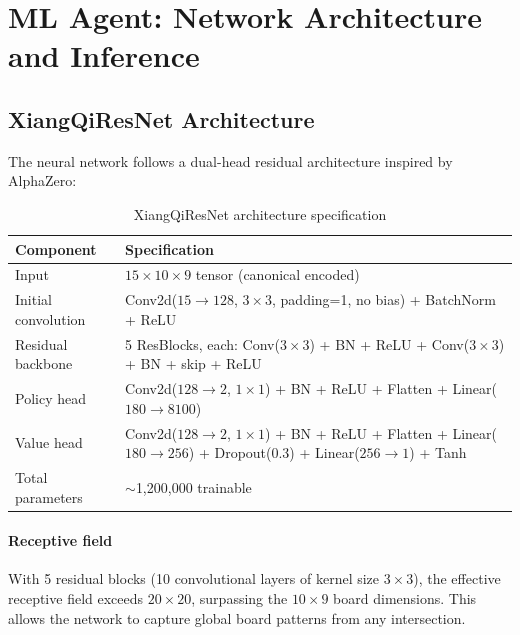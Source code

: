 \documentclass[a4paper,12pt]{article}
\begin{document}

\section{ML Agent: Network Architecture and Inference}

\subsection{XiangQiResNet Architecture}

The neural network follows a dual-head residual architecture inspired by AlphaZero:

\begin{table}[H]
\centering
\caption{XiangQiResNet architecture specification}
\begin{tabularx}{\textwidth}{@{}lX@{}}
\toprule
\textbf{Component} & \textbf{Specification} \\
\midrule
Input & $15 \times 10 \times 9$ tensor (canonical encoded) \\
Initial convolution & Conv2d($15 \to 128$, $3\times3$, padding=1, no bias) + BatchNorm + ReLU \\
Residual backbone & 5 ResBlocks, each: Conv($3\times3$) + BN + ReLU + Conv($3\times3$) + BN + skip + ReLU \\
Policy head & Conv2d($128 \to 2$, $1\times1$) + BN + ReLU + Flatten + Linear($180 \to 8100$) \\
Value head & Conv2d($128 \to 2$, $1\times1$) + BN + ReLU + Flatten + Linear($180 \to 256$) + Dropout(0.3) + Linear($256 \to 1$) + Tanh \\
Total parameters & $\sim$1,200,000 trainable \\
\bottomrule
\end{tabularx}
\end{table}

\paragraph{Receptive field}
With 5 residual blocks (10 convolutional layers of kernel size $3\times3$), the effective receptive field exceeds $20 \times 20$, surpassing the $10 \times 9$ board dimensions. This allows the network to capture global board patterns from any intersection.
\end{document}
